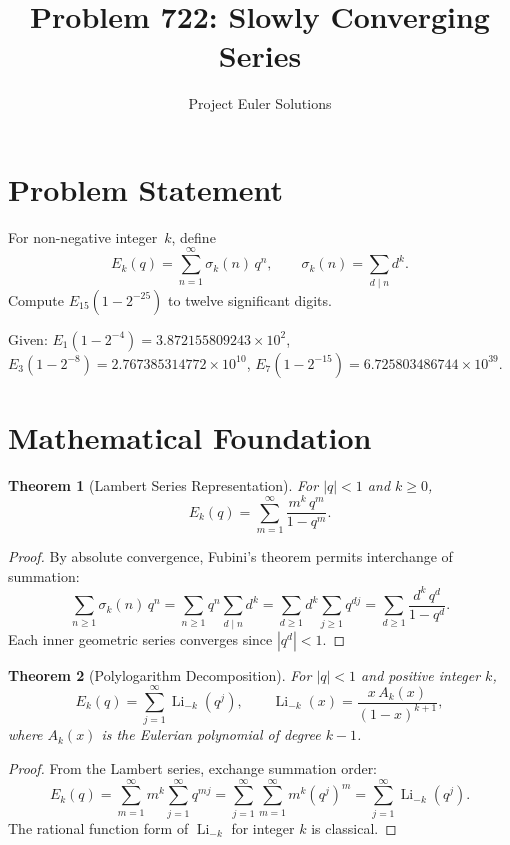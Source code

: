\documentclass[11pt]{article}
\title{Problem 722: Slowly Converging Series}
\author{Project Euler Solutions}
\date{}
\newtheorem{theorem}{Theorem}
\begin{document}
\maketitle

\section{Problem Statement}

For non-negative integer~$k$, define
\[
E_k(q) = \sum_{n=1}^{\infty} \sigma_k(n)\,q^n, \qquad \sigma_k(n) = \sum_{d \mid n} d^k.
\]
Compute $E_{15}(1 - 2^{-25})$ to twelve significant digits.

Given: $E_1(1-2^{-4}) = 3.872155809243 \times 10^2$, $E_3(1-2^{-8}) = 2.767385314772 \times 10^{10}$, $E_7(1-2^{-15}) = 6.725803486744 \times 10^{39}$.

\section{Mathematical Foundation}

\begin{theorem}[Lambert Series Representation]
For $|q| < 1$ and $k \ge 0$,
\[
E_k(q) = \sum_{m=1}^{\infty} \frac{m^k\,q^m}{1 - q^m}.
\]
\end{theorem}

\begin{proof}
By absolute convergence, Fubini's theorem permits interchange of summation:
\[
\sum_{n \ge 1} \sigma_k(n)\,q^n
= \sum_{n \ge 1} q^n \sum_{d \mid n} d^k
= \sum_{d \ge 1} d^k \sum_{j \ge 1} q^{dj}
= \sum_{d \ge 1} \frac{d^k\,q^d}{1-q^d}.
\]
Each inner geometric series converges since $|q^d| < 1$.
\end{proof}

\begin{theorem}[Polylogarithm Decomposition]
For $|q|<1$ and positive integer $k$,
\[
E_k(q) = \sum_{j=1}^{\infty} \operatorname{Li}_{-k}(q^j), \qquad
\operatorname{Li}_{-k}(x) = \frac{x\,A_k(x)}{(1-x)^{k+1}},
\]
where $A_k(x)$ is the Eulerian polynomial of degree $k-1$.
\end{theorem}

\begin{proof}
From the Lambert series, exchange summation order:
\[
E_k(q) = \sum_{m=1}^{\infty} m^k \sum_{j=1}^{\infty} q^{mj}
= \sum_{j=1}^{\infty} \sum_{m=1}^{\infty} m^k (q^j)^m
= \sum_{j=1}^{\infty} \operatorname{Li}_{-k}(q^j).
\]
The rational function form of $\operatorname{Li}_{-k}$ for integer $k$ is classical.
\end{proof}
\end{document}
